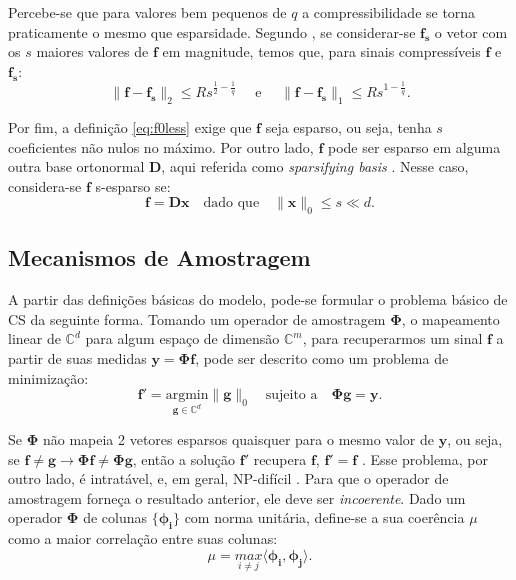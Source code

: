 \documentclass[cic,tc]{iiufrgs}
\renewcommand{\vec}[1]{\bm{#1}}
\begin{document}
Percebe-se que para valores bem pequenos de $q$ a compressibilidade se torna praticamente o mesmo que esparsidade.
Segundo \citet{chen2015compressed}, se considerar-se 
$\vec{f_s}$ o vetor com os $s$ maiores valores de $\vec{f}$ em magnitude, temos que, para sinais compressíveis $\vec{f}$ e 
$\vec{f_s}$:
\begin{equation}
    \lVert \vec{f} - \vec{f_s} \rVert_2 \le Rs^{\frac{1}{2} - \frac{1}{q}} \hspace{1em} \text{ e } \hspace{1em}
    \lVert \vec{f} - \vec{f_s} \rVert_1 \le Rs^{1 - \frac{1}{q}}.
\end{equation} 

Por fim, a definição \eqref{eq:f0less} exige que $\vec{f}$ seja esparso, ou seja, tenha $s$ coeficientes não nulos
no máximo. 
Por outro lado, $\vec{f}$ pode ser esparso em alguma outra base ortonormal $\mathbf{D}$, aqui referida como 
\textit{sparsifying basis} \cite{CandesDecoLinear}. Nesse caso, considera-se $\vec{f}$ s-esparso se:
\begin{equation}
    \vec{f} = \mathbf{D}\vec{x} \hspace{1em} \text{dado que} \hspace{1em} \lVert \vec{x} \rVert_0 \le s \ll d.
\end{equation}


\subsection{Mecanismos de Amostragem}
A partir das definições básicas do modelo, pode-se formular o problema básico de CS da seguinte forma.
Tomando um operador de amostragem $\mathbf{\Phi}$, o mapeamento linear de $\mathbb{C}^d$ para algum espaço de dimensão 
$\mathbb{C}^m$, para recuperarmos um sinal $\vec{f}$ a partir de suas medidas $\vec{y} = \mathbf{\Phi} \vec{f}$,
pode ser descrito como um problema de minimização:
\begin{equation}
    \label{eq:problem}
    \vec{f}' = \underset{\vec{g} \in \mathbb{C}^d}{\text{argmin}} \lVert \vec{g} \rVert_0 \hspace{1em} \text{sujeito a} \hspace{1em}
    \mathbf{\Phi} \vec{g} = \vec{y}.
\end{equation}

Se $\mathbf{\Phi}$ não mapeia 2 vetores esparsos quaisquer para o mesmo valor de $\vec{y}$, ou seja,
se $\vec{f} \ne \vec{g} \rightarrow \mathbf{\Phi}\vec{f} \ne \mathbf{\Phi}\vec{g} $, então a solução $\vec{f}'$ recupera
$\vec{f}$, $\vec{f}' = \vec{f}$ \cite{chen2015compressed}. Esse problema, por outro lado, é intratável, e, em geral,
NP-difícil \cite{Mut05}.
Para que o operador de amostragem forneça o resultado anterior, ele deve ser \textit{incoerente}.
Dado um operador $\mathbf{\Phi}$ de colunas $\{ \vec{\phi_i} \}$  com norma unitária, define-se a sua coerência $\mu$
como a maior correlação entre suas colunas:
\begin{equation}
    \label{eq:coerence}
    \mu = \underset{i \ne j}{max}\langle \vec{\phi_i} , \vec{\phi_j} \rangle.
\end{equation}
\end{document}
